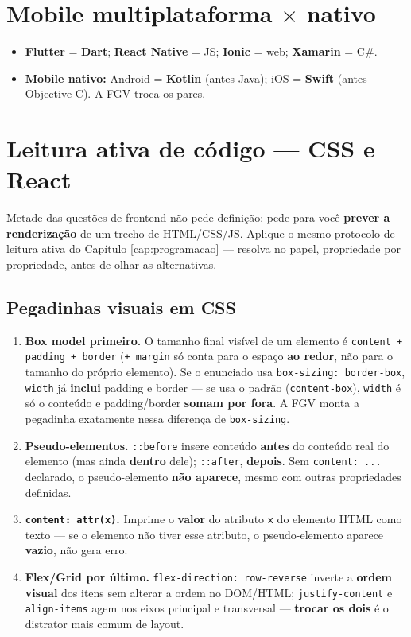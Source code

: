 \section{Mobile multiplataforma $\times$ nativo}

\begin{itemize}
\item \textbf{Flutter} = \textbf{Dart}; \textbf{React Native} = JS;
\textbf{Ionic} = web; \textbf{Xamarin} = C\#.
\item \textbf{Mobile nativo:} Android = \textbf{Kotlin} (antes Java); iOS =
\textbf{Swift} (antes Objective-C). A FGV troca os pares.
\end{itemize}

\section{Leitura ativa de código --- CSS e React}
\label{sec:leitura-ativa-frontend}

Metade das questões de frontend não pede definição: pede para você
\textbf{prever a renderização} de um trecho de HTML/CSS/JS. Aplique o mesmo
protocolo de leitura ativa do Capítulo \ref{cap:programacao} --- resolva no
papel, propriedade por propriedade, antes de olhar as alternativas.

\subsection{Pegadinhas visuais em CSS}

\begin{conceito}
\begin{enumerate}
\item \textbf{Box model primeiro.} O tamanho final visível de um elemento é
\texttt{content + padding + border} (\texttt{+ margin} só conta para o espaço
\textbf{ao redor}, não para o tamanho do próprio elemento). Se o enunciado
usa \texttt{box-sizing: border-box}, \texttt{width} já \textbf{inclui}
padding e border --- se usa o padrão (\texttt{content-box}), \texttt{width}
é só o conteúdo e padding/border \textbf{somam por fora}. A FGV monta a
pegadinha exatamente nessa diferença de \texttt{box-sizing}.
\item \textbf{Pseudo-elementos.} \texttt{::before} insere conteúdo
\textbf{antes} do conteúdo real do elemento (mas ainda \textbf{dentro} dele);
\texttt{::after}, \textbf{depois}. Sem \texttt{content: ...} declarado, o
pseudo-elemento \textbf{não aparece}, mesmo com outras propriedades
definidas.
\item \textbf{\texttt{content: attr(x)}.} Imprime o \textbf{valor} do
atributo \texttt{x} do elemento HTML como texto --- se o elemento não tiver
esse atributo, o pseudo-elemento aparece \textbf{vazio}, não gera erro.
\item \textbf{Flex/Grid por último.} \texttt{flex-direction: row-reverse}
inverte a \textbf{ordem visual} dos itens sem alterar a ordem no DOM/HTML;
\texttt{justify-content} e \texttt{align-items} agem nos eixos principal e
transversal --- \textbf{trocar os dois} é o distrator mais comum de layout.
\end{enumerate}
\end{conceito}

